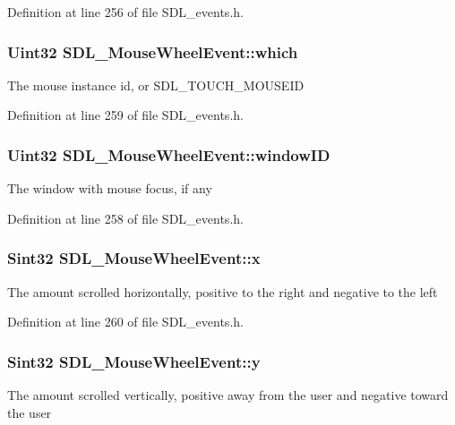 Definition at line 256 of file S\+D\+L\+\_\+events.\+h.

\hypertarget{structSDL__MouseWheelEvent_a014dc767d52e8b75ba26a5f12e1704e8}{
\subsubsection[{which}]{\setlength{\rightskip}{0pt plus 5cm}Uint32 S\+D\+L\+\_\+\+Mouse\+Wheel\+Event\+::which}}\label{structSDL__MouseWheelEvent_a014dc767d52e8b75ba26a5f12e1704e8}
The mouse instance id, or S\+D\+L\+\_\+\+T\+O\+U\+C\+H\+\_\+\+M\+O\+U\+S\+E\+I\+D 

Definition at line 259 of file S\+D\+L\+\_\+events.\+h.

\hypertarget{structSDL__MouseWheelEvent_ab45eb1895217214ecb773fc555e08f6c}{
\subsubsection[{window\+I\+D}]{\setlength{\rightskip}{0pt plus 5cm}Uint32 S\+D\+L\+\_\+\+Mouse\+Wheel\+Event\+::window\+I\+D}}\label{structSDL__MouseWheelEvent_ab45eb1895217214ecb773fc555e08f6c}
The window with mouse focus, if any 

Definition at line 258 of file S\+D\+L\+\_\+events.\+h.

\hypertarget{structSDL__MouseWheelEvent_a6d904eef474ea45a5b1828fcb5b0f859}{
\subsubsection[{x}]{\setlength{\rightskip}{0pt plus 5cm}Sint32 S\+D\+L\+\_\+\+Mouse\+Wheel\+Event\+::x}}\label{structSDL__MouseWheelEvent_a6d904eef474ea45a5b1828fcb5b0f859}
The amount scrolled horizontally, positive to the right and negative to the left 

Definition at line 260 of file S\+D\+L\+\_\+events.\+h.

\hypertarget{structSDL__MouseWheelEvent_a53fdf77a464426bc8b30e629795f044b}{
\subsubsection[{y}]{\setlength{\rightskip}{0pt plus 5cm}Sint32 S\+D\+L\+\_\+\+Mouse\+Wheel\+Event\+::y}}\label{structSDL__MouseWheelEvent_a53fdf77a464426bc8b30e629795f044b}
The amount scrolled vertically, positive away from the user and negative toward the user 

